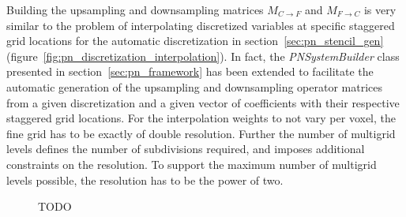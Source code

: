 Building the upsampling and downsampling matrices $M_{C\rightarrow F}$ and $M_{F\rightarrow C}$ is very similar to the problem of interpolating discretized variables at specific staggered grid locations for the automatic discretization in section~\ref{sec:pn_stencil_gen} (figure~\ref{fig:pn_discretization_interpolation}). In fact, the \emph{PNSystemBuilder} class presented in section~\ref{sec:pn_framework} has been extended to facilitate the automatic generation of the upsampling and downsampling operator matrices from a given discretization and a given vector of coefficients with their respective staggered grid locations. For the interpolation weights to not vary per voxel, the fine grid has to be exactly of double resolution. Further the number of multigrid levels defines the number of subdivisions required, and imposes additional constraints on the resolution. To support the maximum number of multigrid levels possible, the resolution has to be the power of two.
\begin{figure}[h]
\centering
{}
\caption{TODO}
\label{fig:da_solver_multigrid_M}
\end{figure}


